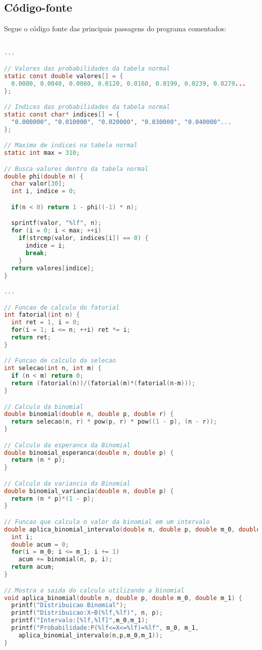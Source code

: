 \documentclass[12pt, a4paper]{article}
\begin{document}
\subsection{Código-fonte}

Segue o código fonte das principais passagens do programa comentados:

\begin{lstlisting}[language=c]

...

// Valores das probabilidades da tabela normal
static const double valores[] = {
  0.0000, 0.0040, 0.0080, 0.0120, 0.0160, 0.0199, 0.0239, 0.0279...
};

// Indices das probabilidades da tabela normal
static const char* indices[] = {
  "0.000000", "0.010000", "0.020000", "0.030000", "0.040000"...
};

// Maximo de indices na tabela normal
static int max = 310;

// Busca valores dentro da tabela normal
double phi(double n) {
  char valor[30];
  int i, indice = 0;

  if(n < 0) return 1 - phi((-1) * n);

  sprintf(valor, "%lf", n);
  for (i = 0; i < max; ++i)
    if(strcmp(valor, indices[i]) == 0) {
      indice = i;
      break;
    }
  return valores[indice];
}

...

// Funcao de calculo do fatorial
int fatorial(int n) {
  int ret = 1, i = 0;
  for(i = 1; i <= n; ++i) ret *= i;
  return ret;
}

// Funcao de calculo da selecao
int selecao(int n, int m) {
  if (n < m) return 0;
  return (fatorial(n))/(fatorial(m)*(fatorial(n-m)));
}

// Calculo da binomial
double binomial(double n, double p, double r) {
  return selecao(n, r) * pow(p, r) * pow((1 - p), (n - r));
}

// Calculo da esperanca da Binomial
double binomial_esperanca(double n, double p) {
  return (n * p);
}

// Calculo da variancia da Binomial
double binomial_variancia(double n, double p) {
  return (n * p)*(1 - p);
}

// Funcao que calcula o valor da binomial em um intervalo
double aplica_binomial_intervalo(double n, double p, double m_0, double m_1) {
  int i;
  double acum = 0;
  for(i = m_0; i <= m_1; i += 1)
    acum += binomial(n, p, i);
  return acum;
}

// Mostra a saida do calculo utilizando a binomial
void aplica_binomial(double n, double p, double m_0, double m_1) {
  printf("Distribuicao Binomial");
  printf("Distribuicao:X~B(%lf,%lf)", n, p);
  printf("Intervalo:[%lf,%lf]",m_0,m_1);
  printf("Probabilidade:P(%lf<=X<=%lf)=%lf", m_0, m_1,
    aplica_binomial_intervalo(n,p,m_0,m_1));
}


\end{lstlisting}
\end{document}

